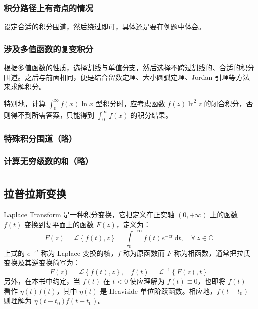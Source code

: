 \documentclass[UTF8]{report}
\def\C{\mathbb{C}}
\theoremstyle{MyLineTheoremStyle} %
\theoremstyle{MyBlockTheoremStyle} %
\theoremstyle{MySubsubsectionStyle} %
\begin{document}
\subsection{积分路径上有奇点的情况}

设定合适的积分围道，然后绕过即可，具体还是要在例题中体会。

\subsection{涉及多值函数的复变积分}

根据多值函数的性质，选择割线与单值分支，然后选择不跨过割线的、合适的积分围道。之后与前面相同，便是结合留数定理、大小圆弧定理、Jordan 引理等方法来求解积分。

特别地，计算 $\int_{0}^{\infty} f(x)\ln x$ 型积分时，应考虑函数 $f(z) \ln^2 z$ 的闭合积分，否则得不到所需答案，只能得到 $\int_{0}^{\infty} f(x)$ 的积分结果。

\subsection{特殊积分围道（略）}

\subsection{计算无穷级数的和（略）}

\chapter{}\thispagestyle{fancy}

\section{拉普拉斯变换}

Laplace Transform 是一种积分变换，它把定义在正实轴 $(0, +\infty)$ 上的函数 $f(t)$ 变换到复平面上的函数 $F(z)$，定义为：
\begin{equation}
    F(z) = \mathscr{L}\left\{ f(t), z \right\} = \int_{0}^{+\infty} f(t)e^{-zt} \ \mathrm{d}t,\quad \forall\ z \in \C
\end{equation}
上式的 $e^{-zt}$ 称为 Laplace 变换的核，$f$ 称为原函数而 $F$ 称为相函数，通常把拉氏变换及其逆变换简写为：
\begin{equation}
    F(z) = \mathscr{L}\left\{ f(t), z \right\} ,\quad f(t) = \mathscr{L}^{-1}\left\{ F(z), t \right\}
\end{equation} 
另外，在本书中约定，当 $f(t)$ 在 $t < 0$ 使应理解为 $f(t) \equiv 0$，也即将 $f(t)$ 看作 $\eta(t) f(t)$，其中 $\eta(t)$ 是 Heaviside 单位阶跃函数。相应地，$f(t - t_0)$ 则理解为 $\eta(t - t_0) f(t - t_0)$。
\end{document}
